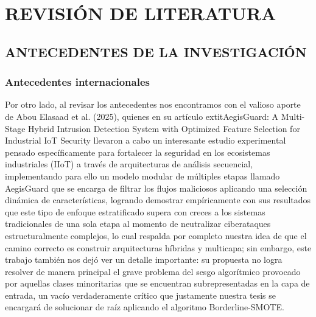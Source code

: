 \chapter{REVISIÓN DE LITERATURA}

\section{ANTECEDENTES DE LA INVESTIGACIÓN}

\subsection{Antecedentes internacionales}

Por otro lado, al revisar los antecedentes nos encontramos con el valioso aporte de Abou Elasaad et al. (2025), quienes en su artículo 	extit{AegisGuard: A Multi-Stage Hybrid Intrusion Detection System with Optimized Feature Selection for Industrial IoT Security} llevaron a cabo un interesante estudio experimental pensado específicamente para fortalecer la seguridad en los ecosistemas industriales (IIoT) a través de arquitecturas de análisis secuencial, implementando para ello un modelo modular de múltiples etapas llamado AegisGuard que se encarga de filtrar los flujos maliciosos aplicando una selección dinámica de características, logrando demostrar empíricamente con sus resultados que este tipo de enfoque estratificado supera con creces a los sistemas tradicionales de una sola etapa al momento de neutralizar ciberataques estructuralmente complejos, lo cual respalda por completo nuestra idea de que el camino correcto es construir arquitecturas híbridas y multicapa; sin embargo, este trabajo también nos dejó ver un detalle importante: su propuesta no logra resolver de manera principal el grave problema del sesgo algorítmico provocado por aquellas clases minoritarias que se encuentran subrepresentadas en la capa de entrada, un vacío verdaderamente crítico que justamente nuestra tesis se encargará de solucionar de raíz aplicando el algoritmo Borderline-SMOTE.

